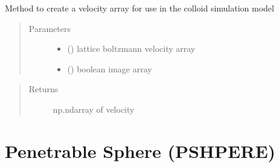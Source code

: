 \documentclass[letterpaper,10pt,english]{sphinxmanual}
\begin{document}
\begin{fulllineitems}
\label{\detokenize{index:lb_colloids.Colloids.Colloid_Setup.LBVArray}}
Method to create a velocity array for use in the colloid simulation model
\begin{quote}\begin{description}
\item[{Parameters}] \leavevmode\begin{itemize}
\item {} 
 () \textendash{} lattice boltzmann velocity array

\item {} 
 () \textendash{} boolean image array

\end{itemize}

\end{description}\end{quote}
\begin{quote}\begin{description}
\item[{Returns}] \leavevmode
np.ndarray of velocity

\end{description}\end{quote}

\end{fulllineitems}



\chapter{Penetrable Sphere (PSHPERE)}
\label{\detokenize{index:penetrable-sphere-pshpere}}\label{\detokenize{index:module-lb_colloids}}
\end{document}

